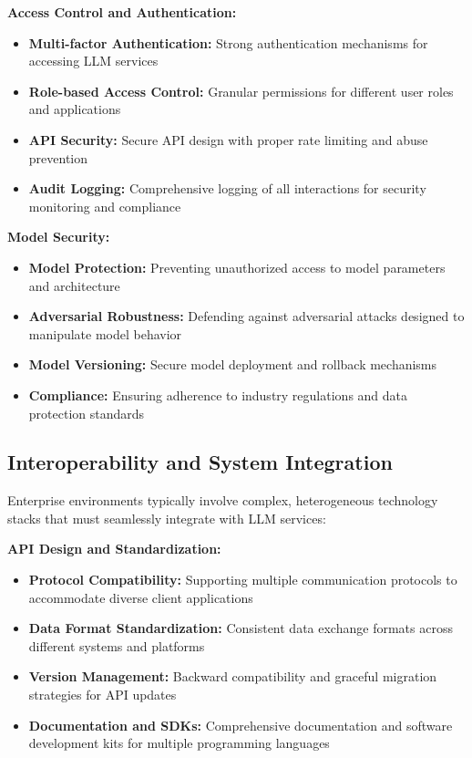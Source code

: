 \textbf{Access Control and Authentication:}
\begin{itemize}
    \item \textbf{Multi-factor Authentication:} Strong authentication mechanisms for accessing LLM services
    \item \textbf{Role-based Access Control:} Granular permissions for different user roles and applications
    \item \textbf{API Security:} Secure API design with proper rate limiting and abuse prevention
    \item \textbf{Audit Logging:} Comprehensive logging of all interactions for security monitoring and compliance
\end{itemize}

\textbf{Model Security:}
\begin{itemize}
    \item \textbf{Model Protection:} Preventing unauthorized access to model parameters and architecture
    \item \textbf{Adversarial Robustness:} Defending against adversarial attacks designed to manipulate model behavior
    \item \textbf{Model Versioning:} Secure model deployment and rollback mechanisms
    \item \textbf{Compliance:} Ensuring adherence to industry regulations and data protection standards
\end{itemize}


\subsection{Interoperability and System Integration}

Enterprise environments typically involve complex, heterogeneous technology stacks that must seamlessly integrate with LLM services:

\textbf{API Design and Standardization:}
\begin{itemize}
    \item \textbf{Protocol Compatibility:} Supporting multiple communication protocols to accommodate diverse client applications
    \item \textbf{Data Format Standardization:} Consistent data exchange formats across different systems and platforms
    \item \textbf{Version Management:} Backward compatibility and graceful migration strategies for API updates
    \item \textbf{Documentation and SDKs:} Comprehensive documentation and software development kits for multiple programming languages
\end{itemize}

